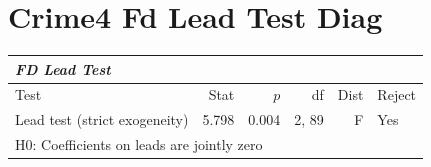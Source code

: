 \documentclass{article}
\begin{document}
\clearpage
\section*{Crime4 Fd Lead Test Diag}

\renewcommand{\arraystretch}{1.1}
\setlength{\tabcolsep}{6pt}
\begin{table}[H]
\centering
\begin{tabular}{lrrrrl}
\hline
\multicolumn{6}{l}{\textit{FD Lead Test}} \\
\hline
Test & Stat & $p$ & df & Dist & Reject \\
\hline
Lead test (strict exogeneity) & 5.798 & 0.004 & 2, 89 & F & Yes \\
\multicolumn{6}{l}{\footnotesize{H0: Coefficients on leads are jointly zero}} \\
\hline
\end{tabular}
\end{table}
\end{document}

